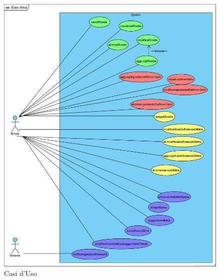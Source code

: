 \documentclass[a4paper,12pt]{report}
\begin{document}
		\begin{figure}[!h]
			\centering
			\includegraphics[width=1\linewidth]{image/Casi-dUso.png}
			\caption{Casi d'Uso}\label{fig:1}
		\end{figure}
\end{document}
